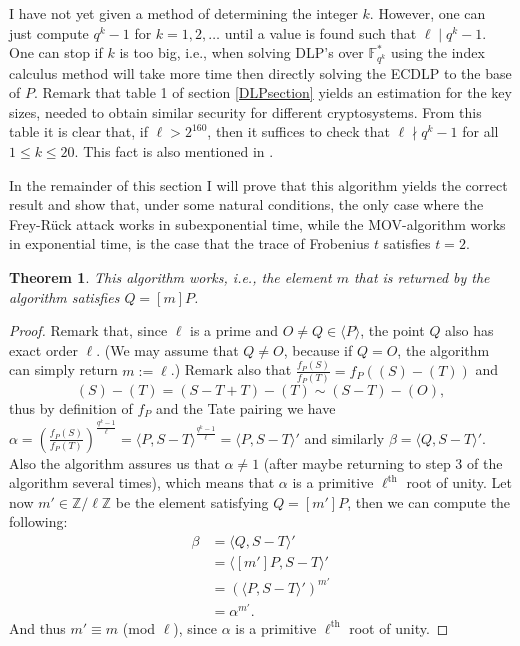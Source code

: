 \documentclass{article}
\numberwithin{equation}{section}
\newtheorem{theorem}{Theorem}[subsection]
\theoremstyle{definition}
\newcommand{\ZZ}{{\mathbb Z}} %
\newcommand{\Zmod}[1]{\ZZ / #1\ZZ} %
\newcommand{\FF}[1]{{\mathbb F}_{#1}} %
\newcommand{\grgen}[1]{\langle #1 \rangle} %
\begin{document}
I have not yet given a method of determining the integer $k$. However, one can just compute $q^k-1$ for $k=1,2,\ldots$ until a value is found such that $\ell \mid q^k-1$. One can stop if $k$ is too big, i.e., when solving DLP's over $\FF{q^k}^*$ using the index calculus method will take more time then directly solving the ECDLP to the base of $P$. Remark that table 1 of section \ref{DLPsection} yields an estimation for the key sizes, needed to obtain similar security for different cryptosystems. From this table it is clear that, if $\ell >2^{160}$, then it suffices to check that $\ell \nmid q^k-1$ for all $1 \leq k \leq 20$. This fact is also mentioned in \cite[4.1.4]{guidetoECC}.\par 
In the remainder of this section I will prove that this algorithm yields the correct result and show that, under some natural conditions, the only case where the Frey-R\"uck attack works in subexponential time, while the MOV-algorithm works in exponential time, is the case that the trace of Frobenius $t$ satisfies $t =2$. \newpage

\begin{theorem}
This algorithm works, i.e., the element $m$ that is returned by the algorithm satisfies $Q=[m]P$.
\end{theorem}

\begin{proof}
Remark that, since $\ell$ is a prime and $O \neq Q \in \grgen{P}$, the point $Q$ also has exact order $\ell$. (We may assume that $Q \neq O$, because if $Q=O$, the algorithm can simply return $m:=\ell$.) Remark also that $\frac{f_P(S)}{f_P(T)}=f_P((S)-(T))$ and $$(S)-(T)=(S-T+T)-(T) \sim (S-T)-(O),$$ thus by definition of $f_P$ and the Tate pairing we have $\alpha=\left(\frac{f_P(S)}{f_P(T)}\right)^{\frac{q^k-1}{\ell}}=\langle P,S-T \rangle^{\frac{q^k-1}{\ell}}=\langle P,S-T \rangle'$ and similarly $\beta=\langle Q,S-T \rangle'$. Also the algorithm assures us that $\alpha \neq 1$ (after maybe returning to step 3 of the algorithm several times), which means that $\alpha$ is a primitive $\ell^\text{th}$ root of unity. Let now $m'\in \Zmod{\ell}$ be the element satisfying $Q=[m']P$, then we can compute the following: \begin{align*} \beta&=\langle Q,S-T \rangle' \\ &= \langle [m']P,S-T \rangle' \\ &= (\langle P,S-T \rangle')^{m'} \\ &= \alpha^{m'}. \end{align*} And thus $m'\equiv m$ (mod $\ell$), since $\alpha$ is a primitive $\ell^\text{th}$ root of unity.
\end{proof}
\end{document}
